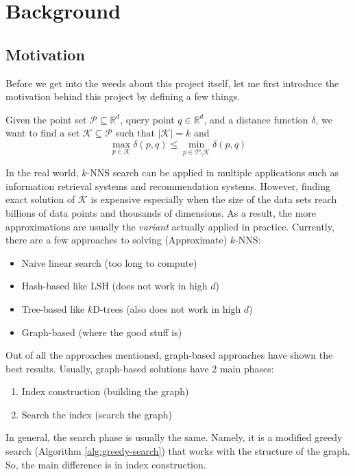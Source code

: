 \section{Background}

\subsection{Motivation}

Before we get into the weeds about this project itself, let me first introduce the motivation behind this project by defining a few things.

\begin{definition}
    Given the point set \(\mathcal{P} \subseteq \mathbb{R}^d\), query point \(q \in \mathbb{R}^d\), and a distance function \(\delta\), we want to find a set \(\mathcal{K} \subseteq \mathcal{P}\) such that \(|\mathcal{K}| = k\) and
    \[
        \max_{p \in \mathcal{K}} \delta(p, q) \leq \min_{p \in \mathcal{P} \setminus \mathcal{K}} \delta(p, q)
    \]
\end{definition}

In the real world, \(k\)-NNS search can be applied in multiple applications such as information retrieval systems and recommendation systems. However, finding exact solution of \(\mathcal{K}\) is expensive especially when the size of the data sets reach billions of data points and thousands of dimensions. As a result, the more approximations are usually the \textit{variant} actually applied in practice. Currently, there are a few approaches to solving (Approximate) \(k\)-NNS:
\begin{itemize}
    \item Naive linear search (too long to compute)
    \item Hash-based like LSH (does not work in high \(d\))
    \item Tree-based like \(k\)D-trees (also does not work in high \(d\))
    \item Graph-based (where the good stuff is)
\end{itemize}
Out of all the approaches mentioned, graph-based approaches have shown the best results. Usually, graph-based solutions have 2 main phases:
\begin{enumerate}
    \item Index construction (building the graph)
    \item Search the index (search the graph)
\end{enumerate}
In general, the search phase is usually the same. Namely, it is a modified greedy search (Algorithm \ref{alg:greedy-search}) that works with the structure of the graph. So, the main difference is in index construction.

